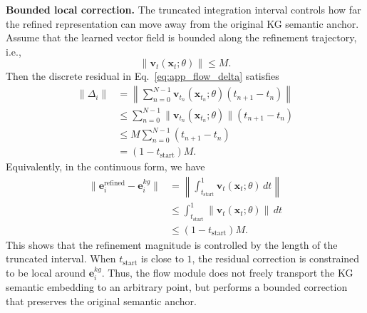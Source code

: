 \noindent\textbf{Bounded local correction.}
The truncated integration interval controls how far the refined representation can move away from the original KG semantic anchor. Assume that the learned vector field is bounded along the refinement trajectory, i.e.,
\[
\|\mathbf{v}_{t}(\mathbf{x}_{t};\theta)\|\le M .
\]
Then the discrete residual in Eq.~\eqref{eq:app_flow_delta} satisfies
\begin{equation}
	\label{eq:app_flow_discrete_bound}
	\begin{aligned}
		\|\Delta_i\|
		&=
		\left\|
		\sum_{n=0}^{N-1}
		\mathbf{v}_{t_n}(\mathbf{x}_{t_n};\theta)
		(t_{n+1}-t_n)
		\right\| \\
		&\le
		\sum_{n=0}^{N-1}
		\|\mathbf{v}_{t_n}(\mathbf{x}_{t_n};\theta)\|
		(t_{n+1}-t_n) \\
		&\le
		M
		\sum_{n=0}^{N-1}
		(t_{n+1}-t_n) \\
		&=
		(1-t_{\mathrm{start}})M .
	\end{aligned}
\end{equation}
Equivalently, in the continuous form, we have
\begin{equation}
	\label{eq:app_flow_continuous_bound}
	\begin{aligned}
		\|\mathbf{e}_i^{\mathrm{refined}}-\mathbf{e}_i^{kg}\|
		&=
		\left\|
		\int_{t_{\mathrm{start}}}^{1}
		\mathbf{v}_{t}(\mathbf{x}_{t};\theta)\,dt
		\right\| \\
		&\le
		\int_{t_{\mathrm{start}}}^{1}
		\|\mathbf{v}_{t}(\mathbf{x}_{t};\theta)\|\,dt \\
		&\le
		(1-t_{\mathrm{start}})M .
	\end{aligned}
\end{equation}
This shows that the refinement magnitude is controlled by the length of the truncated interval. When \(t_{\mathrm{start}}\) is close to \(1\), the residual correction is constrained to be local around \(\mathbf{e}_i^{kg}\). Thus, the flow module does not freely transport the KG semantic embedding to an arbitrary point, but performs a bounded correction that preserves the original semantic anchor.

